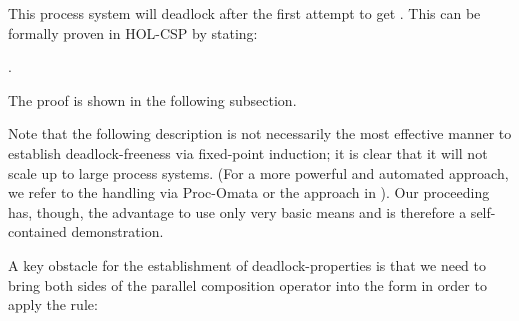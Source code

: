 \begin{isabellebody}
\endisatagproof
{\isafoldproof}%
%
\isadelimproof
%
\endisadelimproof
%
\begin{isamarkuptext}%
This process system will deadlock after the first attempt to get .
This can be formally proven in HOL-CSP by stating: 

.

The proof is shown in the following subsection.%
\end{isamarkuptext}\isamarkuptrue%
%
\isadelimdocument
%
\endisadelimdocument
%
\isatagdocument
%
\isamarkuptrue%
%
\endisatagdocument
{\isafolddocument}%
%
\isadelimdocument
%
\endisadelimdocument
%
\begin{isamarkuptext}%
Note that the following description is not necessarily the most effective manner to establish
deadlock-freeness via fixed-point induction; it is  clear that it will not scale up to large
process systems. (For a more powerful and automated approach, we refer to the handling via Proc-Omata 
\cite{BallenghienW24} or the approach in \cite{ITP2026}). Our proceeding has, though, the advantage 
to use only very basic means and is therefore a self-contained demonstration.%
\end{isamarkuptext}\isamarkuptrue%
%
\begin{isamarkuptext}%
A key obstacle for the establishment of deadlock-properties is that we need to bring
both sides of the parallel composition operator \isa{{\isacharunderscore}{\kern0pt}\ {\isacharbar}{\kern0pt}{\isacharbar}{\kern0pt}\ {\isacharunderscore}{\kern0pt}} into the form  in order
to apply the rule:

\begin{isabelle}%
\ \ \ \ \ \ \ \ \ \ \ \ \ {\isacharbar}{\kern0pt}{\isacharbar}{\kern0pt}\ \ \ \ {\isacharequal}{\kern0pt}\ {\isasymbox}\ {\isasyminter}\ \ {\isasymrightarrow}\ {\isacharparenleft}{\kern0pt}\ \ {\isacharbar}{\kern0pt}{\isacharbar}{\kern0pt}\ \ %
\end{isabelle} 


\end{isamarkuptext}
\end{isabellebody}
